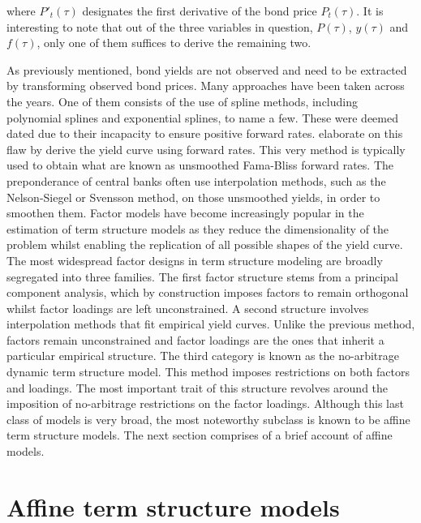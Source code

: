 where \(P'_t\left(\tau\right)\) designates the first derivative of the bond price \(P_t\left(\tau\right)\).
It is interesting to note that out of the three variables in question, \(P(\tau)\), \(y(\tau)\) and \(f(\tau)\), only one of them suffices to derive the remaining two. 

As previously mentioned, bond yields are not observed and need to be extracted by transforming observed bond prices. Many approaches have been taken across the years. One of them consists of the use of spline methods, including polynomial splines and exponential splines, to name a few. These were deemed dated due to their incapacity to ensure positive forward rates. \cite{fama_bliss_1987} elaborate on this flaw by derive the yield curve using forward rates. This very method is typically used to obtain what are known as unsmoothed Fama-Bliss forward rates. The preponderance of central banks often use interpolation methods, such as the Nelson-Siegel or Svensson method, on those unsmoothed yields, in order to smoothen them.
Factor models have become increasingly popular in the estimation of term structure models as they reduce the dimensionality of the problem whilst enabling the replication of all possible shapes of the yield curve. The most widespread factor designs in term structure modeling are broadly segregated into three families. The first factor structure stems from a principal component analysis, which by construction imposes factors to remain orthogonal whilst factor loadings are left unconstrained. A second structure involves interpolation methods that fit empirical yield curves. Unlike the previous method, factors remain unconstrained and factor loadings are the ones that inherit a particular empirical structure. The third category is known as the no-arbitrage dynamic term structure model. This method imposes restrictions on both factors and loadings. The most important trait of this structure revolves around the imposition of no-arbitrage restrictions on the factor loadings. Although this last class of models is very broad, the most noteworthy subclass is known to be affine term structure models. The next section comprises of a brief account of affine models. 


\section{Affine term structure models}

